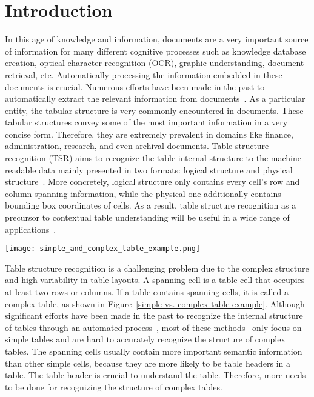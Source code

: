\documentclass[review]{elsarticle}
\begin{document}
\section{Introduction}
	In this age of knowledge and information, documents are a very important source of information for many different cognitive processes such as knowledge database creation, optical character recognition (OCR), graphic understanding, document retrieval, etc. Automatically processing the information embedded in these documents is crucial. Numerous efforts have been made in the past to automatically extract the relevant information from documents~\cite{DSSE, DeCNT, DeepDeSRT}. As a particular entity, the tabular structure is very commonly encountered in documents. These tabular structures convey some of the most important information in a very concise form. Therefore, they are extremely prevalent in domains like finance, administration, research, and even archival documents. Table structure recognition (TSR) aims to recognize the table internal structure to the machine readable data mainly presented in two formats: logical structure and physical structure~\cite{SurveyTable}. More concretely, logical structure only contains every cell’s row and column spanning information, while the physical one additionally contains bounding box coordinates of cells. As a result, table structure recognition as a precursor to contextual table understanding will be useful in a wide range of applications~\cite{DSSE, DeCNT, DeepDeSRT}.

\begin{figure*}[htb]
	\centerline{\texttt{[image: simple\_and\_complex\_table\_example.png]}}
	\caption{An intuitive comparison between simple and complex tables. The example of the simple table is shown in (a), and (b) is its real structure. The example of the complex table is shown in (c), and (d) is its real structure. Note that in (d), the cells with the contents of “System” and “TEDS” occupy multiple rows or multiple columns, so it is a complex table.}
	\label{simple vs. complex table example}
\end{figure*}

Table structure recognition is a challenging problem due to the complex structure and high variability in table layouts. A spanning cell is a table cell that occupies at least two rows or columns. If a table contains spanning cells, it is called a complex table, as shown in Figure~\ref{simple vs. complex table example}. Although significant efforts have been made in the past to recognize the internal structure of tables through an automated process~\cite{DeepDeSRT, EDD, TabStructNet}, most of these methods~\cite{DeepDeSRT, SemanticSegmTSR} only focus on simple tables and are hard to accurately recognize the structure of complex tables. The spanning cells usually contain more important semantic information than other simple cells, because they are more likely to be table headers in a table. The table header is crucial to understand the table. Therefore, more needs to be done for recognizing the structure of complex tables. 
\end{document}

